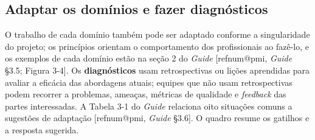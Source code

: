 \documentclass[11pt,a4paper]{article}
\makeatletter
\newcommand{\refnum}[1]{\csname refnum@#1\endcsname}
\makeatother
\begin{document}
\subsection{Adaptar os domínios e fazer diagnósticos}

O trabalho de cada domínio também pode ser adaptado conforme a singularidade do projeto; os princípios orientam o comportamento dos profissionais ao fazê-lo, e os exemplos de cada domínio estão na seção 2 do \textit{Guide} [\refnum{pmi}, \textit{Guide} §3.5; Figura 3-4]. Os \textbf{diagnósticos} usam retrospectivas ou lições aprendidas para avaliar a eficácia das abordagens atuais; equipes que não usam retrospectivas podem recorrer a problemas, ameaças, métricas de qualidade e \textit{feedback} das partes interessadas. A Tabela 3-1 do \textit{Guide} relaciona oito situações comuns a sugestões de adaptação [\refnum{pmi}, \textit{Guide} §3.6]. O quadro resume os gatilhos e a resposta sugerida.
\end{document}
